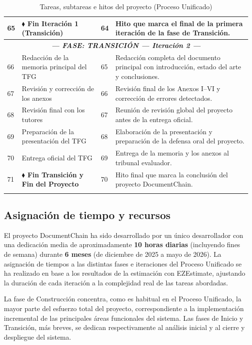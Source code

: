 \documentclass[11pt, a4paper]{article}
\begin{document}
\begin{longtable}{|p{1cm}|p{5.5cm}|p{1.5cm}|p{5.5cm}|}
\hline
65 & \textbf{$\blacklozenge$ Fin Iteración 1 (Transición)} & 64 & Hito que marca el final de la primera iteración de la fase de Transición. \\
\hline
\multicolumn{4}{|c|}{\textit{\textbf{--- FASE: TRANSICIÓN --- Iteración 2 ---}}} \\
\hline
66 & Redacción de la memoria principal del TFG & 65 & Redacción completa del documento principal con introducción, estado del arte y conclusiones. \\
\hline
67 & Revisión y corrección de los anexos & 66 & Revisión final de los Anexos I--VI y corrección de errores detectados. \\
\hline
68 & Revisión final con los tutores & 67 & Reunión de revisión global del proyecto antes de la entrega oficial. \\
\hline
69 & Preparación de la presentación del TFG & 68 & Elaboración de la presentación y preparación de la defensa oral del proyecto. \\
\hline
70 & Entrega oficial del TFG & 69 & Entrega de la memoria y los anexos al tribunal evaluador. \\
\hline
71 & \textbf{$\blacklozenge$ Fin Transición y Fin del Proyecto} & 70 & Hito final que marca la conclusión del proyecto DocumentChain. \\
\hline
\caption{Tareas, subtareas e hitos del proyecto (Proceso Unificado)}
\end{longtable}

\subsection{Asignación de tiempo y recursos}

El proyecto DocumentChain ha sido desarrollado por un único desarrollador con una dedicación media de aproximadamente \textbf{10 horas diarias} (incluyendo fines de semana) durante \textbf{6 meses} (de diciembre de 2025 a mayo de 2026). La asignación de tiempos a las distintas fases e iteraciones del Proceso Unificado se ha realizado en base a los resultados de la estimación con EZEstimate, ajustando la duración de cada iteración a la complejidad real de las tareas abordadas.

La fase de Construcción concentra, como es habitual en el Proceso Unificado, la mayor parte del esfuerzo total del proyecto, correspondiente a la implementación incremental de las principales áreas funcionales del sistema. Las fases de Inicio y Transición, más breves, se dedican respectivamente al análisis inicial y al cierre y despliegue del sistema.
\end{document}
